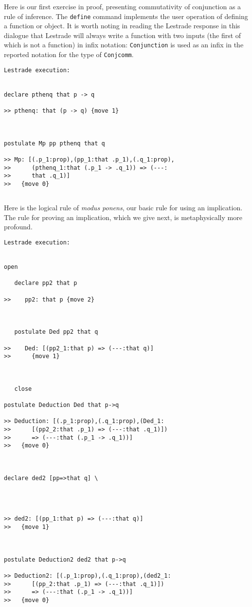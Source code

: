 \documentclass{article}
\begin{document}
Here is our first exercise in proof, presenting commutativity of conjunction as a rule of inference.  The {\tt define} command implements the user operation of defining a function or object.  It is worth  noting in reading the Lestrade response in this dialogue that Lestrade will always write a function with two inputs (the first of which is not a function) in infix notation:  {\tt Conjunction} is used as an infix in the reported notation for the type of {\tt Conjcomm}.

\begin{verbatim}Lestrade execution:


declare pthenq that p -> q

>> pthenq: that (p -> q) {move 1}



postulate Mp pp pthenq that q

>> Mp: [(.p_1:prop),(pp_1:that .p_1),(.q_1:prop),
>>      (pthenq_1:that (.p_1 -> .q_1)) => (---:
>>      that .q_1)]
>>   {move 0}


\end{verbatim}

Here is the logical rule of {\em modus ponens\/}, our basic rule for using an implication.  The rule for proving an implication, which we give next, is metaphysically more profound.

\newpage

\begin{verbatim}Lestrade execution:


open

   declare pp2 that p

>>    pp2: that p {move 2}



   postulate Ded pp2 that q

>>    Ded: [(pp2_1:that p) => (---:that q)]
>>      {move 1}



   close

postulate Deduction Ded that p->q

>> Deduction: [(.p_1:prop),(.q_1:prop),(Ded_1:
>>      [(pp2_2:that .p_1) => (---:that .q_1)])
>>      => (---:that (.p_1 -> .q_1))]
>>   {move 0}



declare ded2 [pp=>that q] \
   



>> ded2: [(pp_1:that p) => (---:that q)]
>>   {move 1}



postulate Deduction2 ded2 that p->q

>> Deduction2: [(.p_1:prop),(.q_1:prop),(ded2_1:
>>      [(pp_2:that .p_1) => (---:that .q_1)])
>>      => (---:that (.p_1 -> .q_1))]
>>   {move 0}


\end{verbatim}
\end{document}
